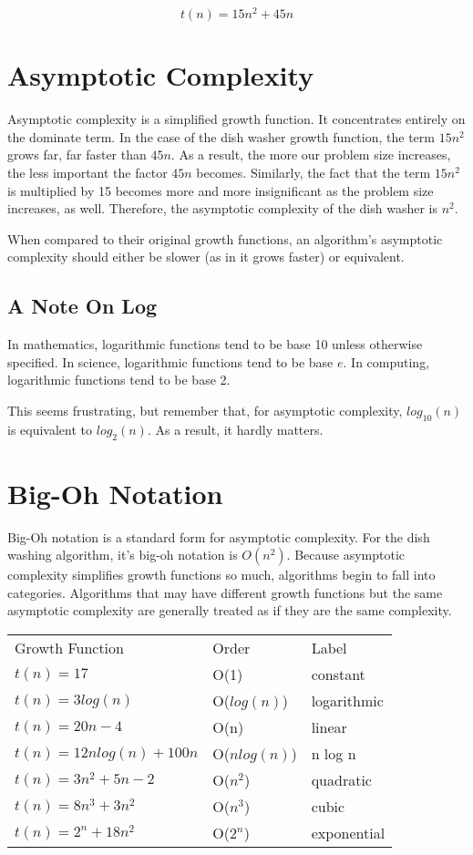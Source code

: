\documentclass{article}
\begin{document}
$$t(n) = 15n^2 + 45n$$

\section{Asymptotic Complexity}
Asymptotic complexity is a simplified growth function. It concentrates entirely
on the dominate term. In the case of the dish washer growth function, the term
$15n^2$ grows far, far faster than $45n$. As a result, the more our problem
size increases, the less important the factor $45n$ becomes. Similarly, the
fact that the term $15n^2$ is multiplied by 15 becomes more and more
insignificant as the problem size increases, as well. Therefore, the asymptotic
complexity of the dish washer is $n^2$.

When compared to their original growth functions, an algorithm's asymptotic
complexity should either be slower (as in it grows faster) or equivalent.

\subsection{A Note On Log}
In mathematics, logarithmic functions tend to be base 10 unless otherwise
specified. In science, logarithmic functions tend to be base $e$. In computing,
logarithmic functions tend to be base 2.

This seems frustrating, but remember that, for asymptotic complexity,
$log_10 (n)$ is equivalent to $log_2 (n)$. As a result, it hardly matters.

\section{Big-Oh Notation}
Big-Oh notation is a standard form for asymptotic complexity. For the dish
washing algorithm, it's big-oh notation is $O(n^2)$. Because asymptotic
complexity simplifies growth functions so much, algorithms begin to fall into
categories. Algorithms that may have different growth functions but the same
asymptotic complexity are generally treated as if they are the same complexity.

\begin{table}[H]
	\centering
	\begin{tabular} { l l l }
		Growth Function & Order & Label \\
		$t(n) = 17$ & O(1) & constant \\
		$t(n) = 3log(n)$ & O($log(n)$) & logarithmic \\
		$t(n) = 20n - 4$ & O(n) & linear \\
		$t(n) = 12n log(n) + 100n$ & O($n log(n)$) & n log n \\
		$t(n) = 3n^2 + 5n - 2$ & O($n^2$) & quadratic \\
		$t(n) = 8n^3 + 3n^2$ & O($n^3$) & cubic \\
		$t(n) = 2^n + 18n^2$ & O($2^n$) & exponential \\
	\end{tabular}
\end{table}
\end{document}
